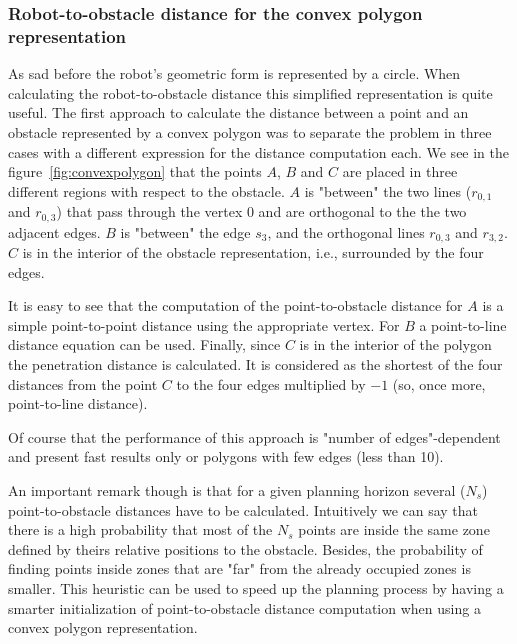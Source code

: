 \subsubsection{Robot-to-obstacle distance for the convex polygon representation}

As sad before the robot's geometric form is represented by a circle.
When calculating the robot-to-obstacle distance this simplified representation is quite useful. 
The first approach to calculate the distance between a point and an obstacle represented by a convex polygon
was to separate the problem in three cases with a different expression for the distance computation each.
We see in the figure~\ref{fig:convexpolygon} that the points $A$, $B$ and $C$ are placed in three different
regions with respect to the obstacle. $A$ is "between" the two lines ($r_{0,1}$ and $r_{0,3}$) that pass through
the vertex $0$ and are orthogonal to the the two adjacent edges. $B$ is "between" the edge $s_{3}$, and the
orthogonal lines $r_{0,3}$ and $r_{3,2}$. $C$ is in the interior of the obstacle representation, i.e., surrounded by the four edges.

It is easy to see that the computation of the point-to-obstacle distance for $A$ is a simple point-to-point distance
using the appropriate vertex. For $B$ a point-to-line distance equation can be used. Finally, since $C$ is in the
interior of the polygon the penetration distance is calculated. It is considered as the shortest of the four distances from the point $C$ to the
four edges multiplied by $-1$ (so, once more, point-to-line distance).

Of course that the performance of this approach is "number of edges"-dependent and present fast results only or 
polygons with few edges (less than 10). 

An important remark though is that for a given planning horizon several ($N_{s}$) point-to-obstacle distances have to be calculated. Intuitively we can say that there
is a high probability that most of the $N_{s}$ points are inside the same zone defined by theirs relative positions to the obstacle.
Besides, the probability of finding points inside zones that are "far" from the already occupied zones is smaller.
This heuristic can be used to speed up the planning process by having a smarter initialization of point-to-obstacle distance computation when using a convex polygon representation.

